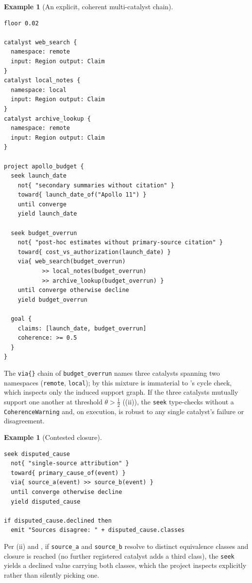 \documentclass[11pt,twocolumn,a4paper]{article}
\theoremstyle{thmstyle}
\theoremstyle{definition}
\newtheorem{example}[theorem]{Example}
\theoremstyle{remark}
\begin{document}
\begin{example}[An explicit, coherent multi-catalyst chain]
\label{ex:coherent}
\begin{lstlisting}[caption={A coherent triangle of independent sources.}]
floor 0.02

catalyst web_search {
  namespace: remote
  input: Region output: Claim
}
catalyst local_notes {
  namespace: local
  input: Region output: Claim
}
catalyst archive_lookup {
  namespace: remote
  input: Region output: Claim
}

project apollo_budget {
  seek launch_date
    not{ "secondary summaries without citation" }
    toward{ launch_date_of("Apollo 11") }
    until converge
    yield launch_date

  seek budget_overrun
    not{ "post-hoc estimates without primary-source citation" }
    toward{ cost_vs_authorization(launch_date) }
    via{ web_search(budget_overrun)
           >> local_notes(budget_overrun)
           >> archive_lookup(budget_overrun) }
    until converge otherwise decline
    yield budget_overrun

  goal {
    claims: [launch_date, budget_overrun]
    coherence: >= 0.5
  }
}
\end{lstlisting}
The \texttt{via\{\}} chain of \texttt{budget\_overrun} names three
catalysts spanning two namespaces (\texttt{remote}, \texttt{local}); by
 this mixture is immaterial to
's cycle check, which inspects only the induced
support graph. If the three catalysts mutually support one another at
threshold $\theta>\tfrac12$ ((ii)), the \texttt{seek}
type-checks without a \texttt{CoherenceWarning} and, on execution, is
robust to any single catalyst's failure or disagreement.
\end{example}

\begin{example}[Contested closure]
\label{ex:decline}
\begin{lstlisting}[caption={A seek that honestly declines.}]
seek disputed_cause
  not{ "single-source attribution" }
  toward{ primary_cause_of(event) }
  via{ source_a(event) >> source_b(event) }
  until converge otherwise decline
  yield disputed_cause

if disputed_cause.declined then
  emit "Sources disagree: " + disputed_cause.classes
\end{lstlisting}
Per (ii) and , if
\texttt{source\_a} and \texttt{source\_b} resolve to distinct equivalence
classes and closure is reached (no further registered catalyst adds a
third class), the \texttt{seek} yields a declined value carrying both
classes, which the project inspects explicitly rather than silently
picking one.
\end{example}
\end{document}
